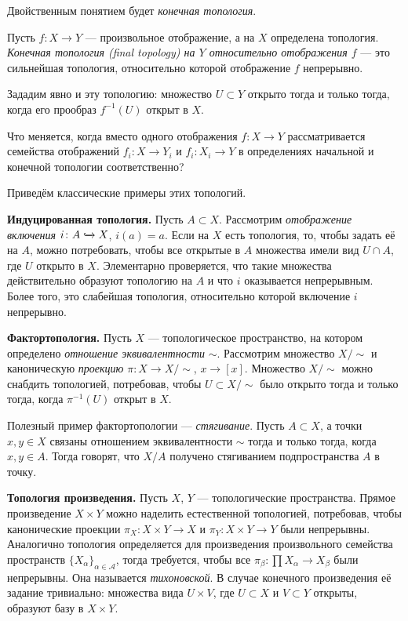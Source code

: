Двойственным понятием будет \textit{конечная топология}.
\begin{defin}
	Пусть $f\colon X\to Y$ --- произвольное отображение, а на $X$ определена топология. \textit{Конечная топология (final topology) на $Y$ относительно отображения $f$} --- это сильнейшая топология, относительно которой отображение $f$ непрерывно.
\end{defin}
Зададим явно и эту топологию: множество $U\subset Y$ открыто тогда и только тогда, когда его прообраз $f^{-1}(U)$ открыт в $X$.
\begin{quest}
	Что меняется, когда вместо одного отображения $f\colon X\to Y$ рассматривается семейства отображений $f_i\colon X\to Y_i$ и $f_i\colon X_i\to Y$ в определениях начальной и конечной топологии соответственно?
\end{quest}
Приведём классические примеры этих топологий.

\textbf{Индуцированная топология.} Пусть $A\subset X$. Рассмотрим \textit{отображение включения} $i\colon A\xhookrightarrow{} X$, $i(a)=a$. Если на $X$ есть топология, то, чтобы задать её на $A$, можно потребовать, чтобы все открытые в $A$ множества имели вид $U\cap A$, где $U$ открыто в $X$. Элементарно проверяется, что такие множества действительно образуют топологию на $A$ и что $i$ оказывается непрерывным. Более того, это слабейшая топология, относительно которой включение $i$ непрерывно.

\textbf{Фактортопология.} Пусть $X$ --- топологическое пространство, на котором определено \textit{отношение эквивалентности} $\sim$. Рассмотрим множество $X/\sim$ и каноническую \textit{проекцию} $\pi\colon X\to X/\sim$, $x\to[x]$. Множество $X/\sim$ можно снабдить топологией, потребовав, чтобы $U\subset X/\sim$ было открыто тогда и только тогда, когда $\pi^{-1}(U)$ открыт в $X$.

Полезный пример фактортопологии --- \textit{стягивание}. Пусть $A\subset X$, а точки $x,y\in X$ связаны отношением эквивалентности $\sim$ тогда и только тогда, когда $x,y\in A$. Тогда говорят, что $X/A$ получено стягиванием подпространства $A$ в точку.

\textbf{Топология произведения.} Пусть $X$, $Y$ --- топологические пространства. Прямое произведение $X\times Y$ можно наделить естественной топологией, потребовав, чтобы канонические проекции $\pi_X\colon X\times Y\to X$ и $\pi_Y\colon X\times Y\to Y$ были непрерывны. Аналогично топология определяется для произведения произвольного семейства пространств $\{X_{\alpha}\}_{\alpha\in\mathcal{A}}$, тогда требуется, чтобы все $\pi_{\beta}\colon\prod X_{\alpha}\to X_{\beta}$ были непрерывны. Она называется \textit{тихоновской}. В случае конечного произведения её задание тривиально: множества вида $U\times V$, где $U\subset X$ и $V\subset Y$ открыты, образуют базу в $X\times Y$.

